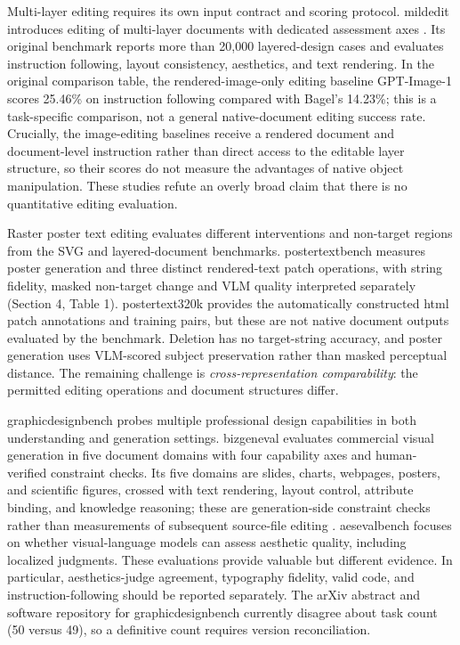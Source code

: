 Multi-layer editing requires its own input contract and scoring protocol.
\ac{mildedit} introduces editing of multi-layer documents with dedicated assessment axes \citep{mildedit2026}.
Its original benchmark reports more than 20,000 layered-design cases and evaluates instruction following, layout consistency, aesthetics, and text rendering.
In the original comparison table, the rendered-image-only editing baseline GPT-Image-1 scores 25.46\% on instruction following compared with Bagel's 14.23\%; this is a task-specific comparison, not a general native-document editing success rate.
Crucially, the image-editing baselines receive a rendered document and document-level instruction rather than direct access to the editable layer structure, so their scores do not measure the advantages of native object manipulation.
These studies refute an overly broad claim that there is no quantitative editing evaluation.

Raster poster text editing evaluates different interventions and non-target regions from the SVG and layered-document benchmarks.
\ac{postertextbench} measures poster generation and three distinct rendered-text patch operations, with string fidelity, masked non-target change and VLM quality interpreted separately (Section 4, Table 1).
\ac{postertext320k} provides the automatically constructed \ac{html} patch annotations and training pairs, but these are not native document outputs evaluated by the benchmark.
Deletion has no target-string accuracy, and poster generation uses VLM-scored subject preservation rather than masked perceptual distance.
The remaining challenge is \emph{cross-representation comparability}: the permitted editing operations and document structures differ.

\ac{graphicdesignbench} probes multiple professional design capabilities in both understanding and generation settings.
\ac{bizgeneval} evaluates commercial visual generation in five document domains with four capability axes and human-verified constraint checks.
Its five domains are slides, charts, webpages, posters, and scientific figures, crossed with text rendering, layout control, attribute binding, and knowledge reasoning; these are generation-side constraint checks rather than measurements of subsequent source-file editing \citep{li2026bizgeneval}.
\ac{aesevalbench} focuses on whether visual-language models can assess aesthetic quality, including localized judgments.
These evaluations provide valuable but different evidence.
In particular, aesthetics-judge agreement, typography fidelity, valid code, and instruction-following should be reported separately.
The arXiv abstract and software repository for \ac{graphicdesignbench} currently disagree about task count (50 versus 49), so a definitive count requires version reconciliation.

